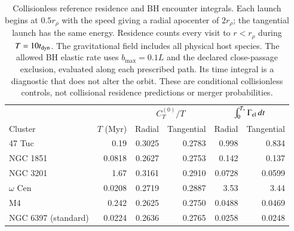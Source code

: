 \begin{table}[t]
\caption{Collisionless reference residence and BH encounter integrals. Each launch begins at $0.5r_\rho$ with the speed giving a radial apocenter of $2r_\rho$; the tangential launch has the same energy. Residence counts every visit to $r<r_\rho$ during $T=10t_{\rm dyn}$. The gravitational field includes all physical host species. The allowed BH elastic rate uses $b_{\max}=0.1L$ and the declared close-passage exclusion, evaluated along each prescribed path. Its time integral is a diagnostic that does not alter the orbit. These are conditional collisionless controls, not collisional residence predictions or merger probabilities.}\label{tab:collisionless-residence}
\centering\begin{tabular}{lrrrrr}
\toprule
 & & \multicolumn{2}{c}{$C^{(0)}_T/T$} & \multicolumn{2}{c}{$\int_0^{T_*}\Gamma_{\rm el}\,dt$} \\
Cluster & $T$ (Myr) & Radial & Tangential & Radial & Tangential \\
\midrule
47 Tuc & 0.19 & 0.3025 & 0.2783 & 0.998 & 0.834 \\
NGC 1851 & 0.0818 & 0.2627 & 0.2753 & 0.142 & 0.137 \\
NGC 3201 & 1.67 & 0.3161 & 0.2910 & 0.0728 & 0.0599 \\
$\omega$ Cen & 0.0208 & 0.2719 & 0.2887 & 3.53 & 3.44 \\
M4 & 0.242 & 0.2625 & 0.2750 & 0.0488 & 0.0469 \\
NGC 6397 (standard) & 0.0224 & 0.2636 & 0.2765 & 0.0258 & 0.0248 \\
\bottomrule
\end{tabular}
\end{table}
